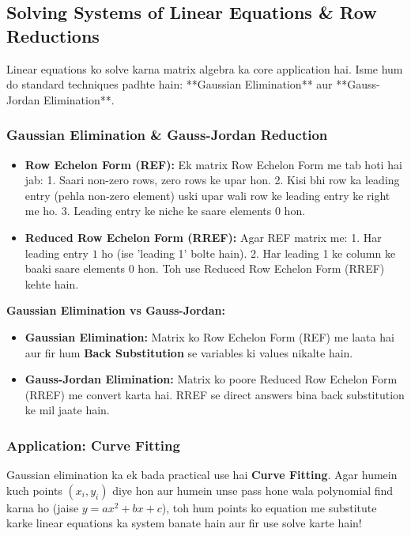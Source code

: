 \documentclass[11pt,a4paper]{article}
\begin{document}
\subsection{Solving Systems of Linear Equations \& Row Reductions}

Linear equations ko solve karna matrix algebra ka core application hai. Isme hum do standard techniques padhte hain: **Gaussian Elimination** aur **Gauss-Jordan Elimination**.

\subsubsection{Gaussian Elimination \& Gauss-Jordan Reduction}
\begin{itemize}
    \item \textbf{Row Echelon Form (REF):} Ek matrix Row Echelon Form me tab hoti hai jab:
        1. Saari non-zero rows, zero rows ke upar hon.
        2. Kisi bhi row ka leading entry (pehla non-zero element) uski upar wali row ke leading entry ke right me ho.
        3. Leading entry ke niche ke saare elements 0 hon.
    \item \textbf{Reduced Row Echelon Form (RREF):} Agar REF matrix me:
        1. Har leading entry $1$ ho (ise 'leading 1' bolte hain).
        2. Har leading 1 ke column ke baaki saare elements 0 hon.
        Toh use Reduced Row Echelon Form (RREF) kehte hain.
\end{itemize}

\begin{hinglishbox}
\textbf{Gaussian Elimination vs Gauss-Jordan:}
\begin{itemize}
    \item \textbf{Gaussian Elimination:} Matrix ko Row Echelon Form (REF) me laata hai aur fir hum \textbf{Back Substitution} se variables ki values nikalte hain.
    \item \textbf{Gauss-Jordan Elimination:} Matrix ko poore Reduced Row Echelon Form (RREF) me convert karta hai. RREF se direct answers bina back substitution ke mil jaate hain.
\end{itemize}
\end{hinglishbox}

\subsubsection{Application: Curve Fitting}
Gaussian elimination ka ek bada practical use hai \textbf{Curve Fitting}. Agar humein kuch points $(x_i, y_i)$ diye hon aur humein unse pass hone wala polynomial find karna ho (jaise $y = ax^2 + bx + c$), toh hum points ko equation me substitute karke linear equations ka system banate hain aur fir use solve karte hain!
\end{document}
